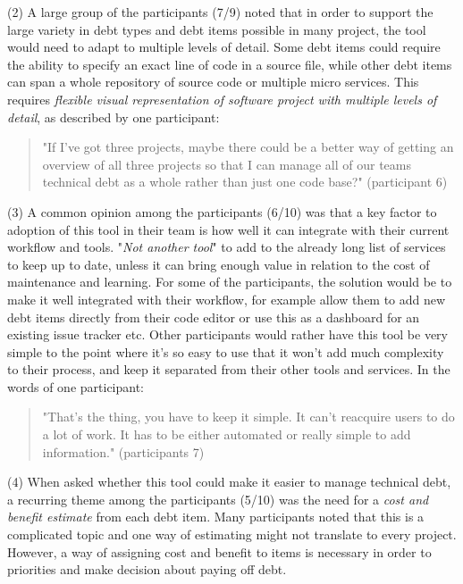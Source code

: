 (2) A large group of the participants (7/9) noted that in order to support the large variety in debt types and debt items possible in many project, the tool would need to adapt to multiple levels of detail.
Some debt items could require the ability to specify an exact line of code in a source file, while other debt items can span a whole repository of source code or multiple micro services.
This requires \textit{flexible visual representation of software project with multiple levels of detail}, as described by one participant:
\begin{quote}
  "If I've got three projects, maybe there could be a better way of getting an overview of all three projects so that I can manage all of our teams technical debt as a whole rather than just one code base?" (participant 6)
\end{quote}

(3) A common opinion among the participants (6/10) was that a key factor to adoption of this tool in their team is how well it can integrate with their current workflow and tools.
"\textit{Not another tool}" to add to the already long list of services to keep up to date, unless it can bring enough value in relation to the cost of maintenance and learning.
For some of the participants, the solution would be to make it well integrated with their workflow, for example allow them to add new debt items directly from their code editor or use this as a dashboard for an existing issue tracker etc.
Other participants would rather have this tool be very simple to the point where it's so easy to use that it won't add much complexity to their process, and keep it separated from their other tools and services. 
In the words of one participant:
\begin{quote}
  "That's the thing, you have to keep it simple. It can't reacquire users to do a lot of work. It has to be either automated or really simple to add information." (participants 7)
\end{quote}

(4) When asked whether this tool could make it easier to manage technical debt, a recurring theme among the participants (5/10) was the need for a \textit{cost and benefit estimate} from each debt item.
Many participants noted that this is a complicated topic and one way of estimating might not translate to every project.
However, a way of assigning cost and benefit to items is necessary in order to priorities and make decision about paying off debt.